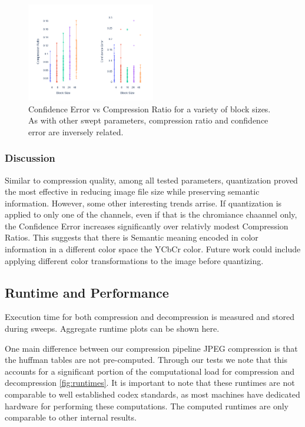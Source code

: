 \begin{figure}
    \includegraphics[width=0.5\textwidth]{assets/Confidence Err Vs Block Size.png}
    \caption{Confidence Error vs Compression Ratio for a variety of block sizes. As with other swept parameters, compression ratio and confidence error are inversely related.}
    \label{fig:block_size_sweep}
\end{figure}

\subsubsection{Discussion}

Similar to compression quality, among all tested parameters, quantization proved the most effective in reducing image file size while preserving semantic information. However, some other interesting trends arrise. If quantization is applied to only one of the channels, even if that is the chromiance chaannel only, the Confidence Error increases significantly over relativly modest Compression Ratios. This suggests that there is Semantic meaning encoded in color information in a different color space the YCbCr color. Future work could include applying different color transformations to the image before quantizing.

\subsection{Runtime and Performance}
Execution time for both compression and decompression is measured and stored during sweeps. Aggregate runtime plots can be shown here.

One main difference between our compression pipeline JPEG compression is that the huffman tables are not pre-computed. Through our tests we note that this accounts for a significant portion of the computational load for compression and decompression \ref{fig:runtimes}. It is important to note that these runtimes are not comparable to well established codex standards, as most machines have dedicated hardware for performing these computations. The computed runtimes are only comparable to other internal results. 

